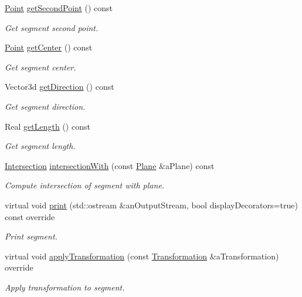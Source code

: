 \begin{DoxyCompactItemize}
\hyperlink{classlibrary_1_1math_1_1geom_1_1d3_1_1objects_1_1_point}{Point} \hyperlink{classlibrary_1_1math_1_1geom_1_1d3_1_1objects_1_1_segment_a5d824fed334185975226d8f7e8489ced}{get\+Second\+Point} () const
\begin{DoxyCompactList}\small\item\em Get segment second point. \end{DoxyCompactList}\item 
\hyperlink{classlibrary_1_1math_1_1geom_1_1d3_1_1objects_1_1_point}{Point} \hyperlink{classlibrary_1_1math_1_1geom_1_1d3_1_1objects_1_1_segment_a6788da2dd6ee48ded2da197c01ea7f3d}{get\+Center} () const
\begin{DoxyCompactList}\small\item\em Get segment center. \end{DoxyCompactList}\item 
Vector3d \hyperlink{classlibrary_1_1math_1_1geom_1_1d3_1_1objects_1_1_segment_afc15a855d660d67e96467466c4442bbc}{get\+Direction} () const
\begin{DoxyCompactList}\small\item\em Get segment direction. \end{DoxyCompactList}\item 
Real \hyperlink{classlibrary_1_1math_1_1geom_1_1d3_1_1objects_1_1_segment_a16b011c680e3102b8b44e6c88ffff81d}{get\+Length} () const
\begin{DoxyCompactList}\small\item\em Get segment length. \end{DoxyCompactList}\item 
\hyperlink{classlibrary_1_1math_1_1geom_1_1d3_1_1_intersection}{Intersection} \hyperlink{classlibrary_1_1math_1_1geom_1_1d3_1_1objects_1_1_segment_a75768b02696b8ce9415b7f2da7d8f411}{intersection\+With} (const \hyperlink{classlibrary_1_1math_1_1geom_1_1d3_1_1objects_1_1_plane}{Plane} \&a\+Plane) const
\begin{DoxyCompactList}\small\item\em Compute intersection of segment with plane. \end{DoxyCompactList}\item 
virtual void \hyperlink{classlibrary_1_1math_1_1geom_1_1d3_1_1objects_1_1_segment_a2d3c1a17842ee4ee83cffda33911291d}{print} (std\+::ostream \&an\+Output\+Stream, bool display\+Decorators=true) const override
\begin{DoxyCompactList}\small\item\em Print segment. \end{DoxyCompactList}\item 
virtual void \hyperlink{classlibrary_1_1math_1_1geom_1_1d3_1_1objects_1_1_segment_a63c7017391bcc0e67f4d97311e7ebdb2}{apply\+Transformation} (const \hyperlink{classlibrary_1_1math_1_1geom_1_1d3_1_1_transformation}{Transformation} \&a\+Transformation) override
\begin{DoxyCompactList}\small\item\em Apply transformation to segment. \end{DoxyCompactList}\end{DoxyCompactItemize}
